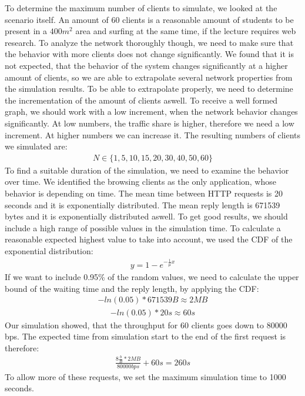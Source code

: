 \documentclass[
10pt, %
a4paper, %
oneside, %
headinclude,footinclude, %
BCOR5mm, %
]{scrartcl}
\begin{document}
To determine the maximum number of clients to simulate, we looked at the scenario itself. An amount of 60 clients is a reasonable amount of students to be present in a $400m^{2}$ area and surfing at the same time, if the lecture requires web research. To analyze the network thoroughly though, we need to make sure that the behavior with more clients does not change significantly. We found that it is not expected, that the behavior of the system changes significantly at a higher amount of clients, so we are able to extrapolate several network properties from the simulation results.
To be able to extrapolate properly, we need to determine the incrementation of the amount of clients aswell. To receive a well formed graph, we should work with a low increment, when the network behavior changes significantly. At low numbers, the traffic share is higher, therefore we need a low increment. At higher numbers we can increase it. The resulting numbers of clients we simulated are:
\begin{align*}
N \in \{1,5,10,15,20,30,40,50,60\}
\end{align*}
To find a suitable duration of the simulation, we need to examine the behavior over time. We identified the browsing clients as the only application, whose behavior is depending on time. The mean time between HTTP requests is 20 seconds and it is exponentially distributed. The mean reply length is 671539 bytes and it is exponentially distributed aswell. To get good results, we should include a high range of possible values in the simulation time. To calculate a reasonable expected highest value to take into account, we used the CDF of the exponential distribution:
\begin{align*}
y = 1-e^{-{\frac{1}{\mu}x}}
\end{align*}
If we want to include 0.95\% of the random values, we need to calculate the upper bound of the waiting time and the reply length, by applying the CDF:
\begin{align*}
{-ln(0.05)} * 671539 B \approx 2MB
\end{align*}
\begin{align*}
{-ln(0.05)} * 20s \approx 60s
\end{align*}
Our simulation showed, that the throughput for 60 clients goes down to 80000 bps. The expected time from simulation start to the end of the first request is therefore: 
\begin{align*}
\frac{8\frac{b}{B} * 2MB}{80000 bps} + 60s = 260s
\end{align*}
To allow more of these requests, we set the maximum simulation time to 1000 seconds.
\end{document}
